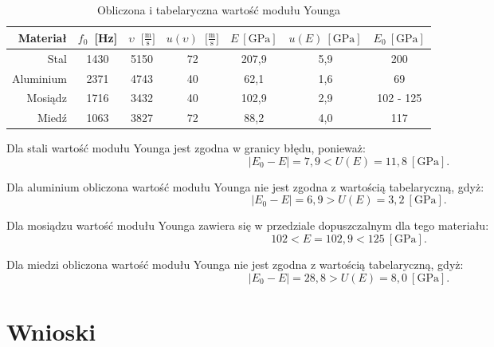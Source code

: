 \documentclass[12pt,a4paper]{article}
\numberwithin{equation}{section}
\begin{document}
\begin{table}[!ht]
	\caption{Obliczona i tabelaryczna wartość modułu Younga}
	\centering
	\begin{adjustbox}{width=1\textwidth}
	\begin{center}
		\begin{tabular}{r|c|c|c|c|c|c}
			\hline  \rule{0pt}{18pt} 
			Materiał & $f_0$~[Hz] & $\upsilon$~$\Big[\frac{\textrm{m}}{\textrm{s}}\Big]$ & $u(\upsilon)$~$\Big[\frac{\textrm{m}}{\textrm{s}}\Big]$ & $E~[\textrm{GPa}]$ & $u(E)~[\textrm{GPa}]$ & $E_0~[\textrm{GPa}]$\\ \hline \hline
			Stal & 1430 & 5150 & 72 & 207,9 & 5,9 & 200 \\
			Aluminium & 2371 & 4743 & 40 & 62,1 & 1,6 & 69  \\
			Mosiądz & 1716 & 3432 & 40 & 102,9 & 2,9 & 102 - 125  \\
			Miedź & 1063 & 3827 & 72 & 88,2 & 4,0 & 117  \\ \hline
		\end{tabular}
	\end{center}
	\end{adjustbox}
	\label{tab:tab3}
\end{table}

Dla stali wartość modułu Younga jest zgodna w granicy błędu, ponieważ:
\begin{equation}
	\Big|E_0 - E\Big| = 7,9 < U(E) = 11,8~[\textrm{GPa}].
\end{equation}

Dla aluminium obliczona wartość modułu Younga nie jest zgodna z wartością tabelaryczną, gdyż:
\begin{equation}
\Big|E_0 - E\Big| = 6,9 > U(E) = 3,2~[\textrm{GPa}].
\end{equation}

Dla mosiądzu wartość modułu Younga zawiera się w przedziale dopuszczalnym dla tego materiału:
\begin{equation}
	102 < E = 102,9 < 125~[\textrm{GPa}].
\end{equation}

Dla miedzi obliczona wartość modułu Younga nie jest zgodna z wartością tabelaryczną, gdyż:
\begin{equation}
\Big|E_0 - E\Big| = 28,8 > U(E) = 8,0~[\textrm{GPa}].
\end{equation}

\pagebreak
\section{Wnioski}
\end{document}
